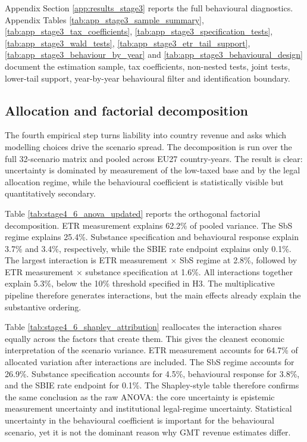 \documentclass[11pt,a4paper]{article}
\begin{document}
Appendix Section \ref{app:results_stage3} reports the full behavioural diagnostics. Appendix Tables \ref{tab:app_stage3_sample_summary}, \ref{tab:app_stage3_tax_coefficients}, \ref{tab:app_stage3_specification_tests}, \ref{tab:app_stage3_wald_tests}, \ref{tab:app_stage3_etr_tail_support}, \ref{tab:app_stage3_behaviour_by_year} and \ref{tab:app_stage3_behavioural_design} document the estimation sample, tax coefficients, non-nested tests, joint tests, lower-tail support, year-by-year behavioural filter and identification boundary.

\subsection{Allocation and factorial decomposition}\label{sec:results_factorial}

The fourth empirical step turns liability into country revenue and asks which modelling choices drive the scenario spread. The decomposition is run over the full 32-scenario matrix and pooled across EU27 country-years. The result is clear: uncertainty is dominated by measurement of the low-taxed base and by the legal allocation regime, while the behavioural coefficient is statistically visible but quantitatively secondary.



Table \ref{tab:stage4_6_anova_updated} reports the orthogonal factorial decomposition. ETR measurement explains 62.2\% of pooled variance. The SbS regime explains 25.4\%. Substance specification and behavioural response explain 3.7\% and 3.4\%, respectively, while the SBIE rate endpoint explains only 0.1\%. The largest interaction is ETR measurement $\times$ SbS regime at 2.8\%, followed by ETR measurement $\times$ substance specification at 1.6\%. All interactions together explain 5.3\%, below the 10\% threshold specified in H3. The multiplicative pipeline therefore generates interactions, but the main effects already explain the substantive ordering.



Table \ref{tab:stage4_6_shapley_attribution} reallocates the interaction shares equally across the factors that create them. This gives the cleanest economic interpretation of the scenario variance. ETR measurement accounts for 64.7\% of allocated variation after interactions are included. The SbS regime accounts for 26.9\%. Substance specification accounts for 4.5\%, behavioural response for 3.8\%, and the SBIE rate endpoint for 0.1\%. The Shapley-style table therefore confirms the same conclusion as the raw ANOVA: the core uncertainty is epistemic measurement uncertainty and institutional legal-regime uncertainty. Statistical uncertainty in the behavioural coefficient is important for the behavioural scenario, yet it is not the dominant reason why GMT revenue estimates differ.
\end{document}
